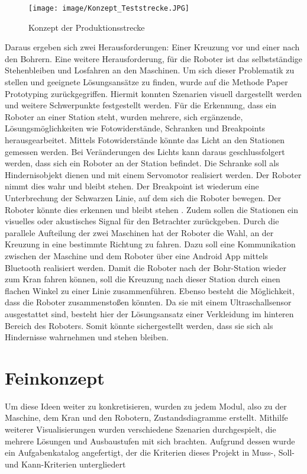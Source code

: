 \begin{figure}[h]
	\begin{center}
		\texttt{[image: image/Konzept\_Teststrecke.JPG]}
		\caption{Konzept der Produktionsstrecke}
		\label{Grundidee}
	\end{center}
\end{figure}

Daraus ergeben sich zwei Herausforderungen: Einer Kreuzung vor und einer nach den Bohrern.
Eine weitere Herausforderung, für die Roboter ist das selbstständige Stehenbleiben und Losfahren an den Maschinen. Um sich dieser Problematik zu stellen und geeignete Lösungsansätze zu finden, wurde auf die Methode Paper Prototyping zurückgegriffen. Hiermit konnten Szenarien visuell dargestellt werden und weitere Schwerpunkte festgestellt werden. Für die Erkennung, dass ein
Roboter an einer Station steht, wurden mehrere, sich ergänzende, Lösungsmöglichkeiten wie Fotowiderstände, Schranken und Breakpoints herausgearbeitet. Mittels Fotowiderstände könnte das Licht an den Stationen gemessen werden. Bei Veränderungen des Lichts kann daraus geschlussfolgert werden, dass sich ein Roboter an der Station befindet. Die Schranke soll als Hindernisobjekt dienen und mit einem Servomotor realisiert werden. Der Roboter nimmt dies wahr und bleibt stehen.   
Der Breakpoint ist wiederum eine Unterbrechung der Schwarzen Linie, auf dem sich die Roboter bewegen. Der Roboter könnte dies erkennen und bleibt stehen .  Zudem sollen die Stationen ein visuelles oder akustisches Signal für den Betrachter zurückgeben.  Durch die parallele Aufteilung der zwei Maschinen hat der Roboter die Wahl, an der Kreuzung in eine bestimmte Richtung zu fahren. Dazu soll eine Kommunikation zwischen der Maschine und dem Roboter über eine Android App mittels Bluetooth realisiert werden. Damit die Roboter nach der Bohr-Station wieder zum Kran fahren können, soll die Kreuzung nach dieser Station durch einen flachen Winkel zu einer Linie zusammenführen. Ebenso besteht die Möglichkeit, dass die Roboter zusammenstoßen könnten. Da sie mit einem Ultraschallsensor ausgestattet sind, besteht hier der Lösungsansatz einer Verkleidung im hinteren Bereich des Roboters. Somit könnte sichergestellt werden, dass sie sich als Hindernisse
wahrnehmen und stehen bleiben.

\section{Feinkonzept}
Um diese Ideen weiter zu konkretisieren, wurden zu jedem Modul, also zu der Maschine, dem
Kran und den Robotern, Zustandsdiagramme erstellt. Mithilfe weiterer Visualisierungen wurden verschiedene Szenarien durchgespielt, die mehrere Lösungen und Ausbaustufen mit sich
brachten. Aufgrund dessen wurde ein Aufgabenkatalog angefertigt, der die Kriterien dieses
Projekt in Muss-, Soll- und Kann-Kriterien untergliedert


